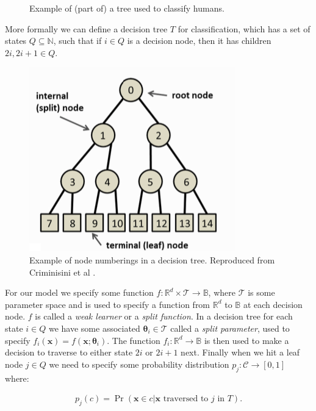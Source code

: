 \documentclass[12pt,twoside,notitlepage]{report}
\newcommand{\vc}[1]{\mathbf{#1}}
\newcommand{\cl}[1]{\mathcal{#1}}
\newcommand{\bb}[1]{\mathbb{#1}}
\begin{document}
\begin{figure}
                \caption{Example of (part of) a tree used to classify humans.}
                \label{fig:intuitive_tree}
            \end{figure}

            More formally we can define a decision tree $T$ for classification, which has a set of states $Q \subseteq 
            \bb{N}$, such that if $i \in Q$ is a decision node, then it has children $2i, 2i+1 \in Q$. 

            \begin{figure}
                \centering
                \includegraphics[scale=0.8]{tree_node_labels}
                \caption[Example of node numberings in a decision tree.]{Example of node numberings in a decision tree. Reproduced from Criminisini et al \cite{criminisi2012decision}.}
            \end{figure}

            For our model we specify some function $f:\bb{R}^d \times \cl{T} \rightarrow \bb{B}$, where $\cl{T}$ is some 
            parameter space and is used to specify a function from $\bb{R}^d$ to $\bb{B}$ at each decision node.  
            $f$ is called a \textit{weak learner} or a \textit{split function}. In a decision tree for each state $i \in Q$ we have 
            some associated $\vc{\theta}_i \in \cl{T}$ called a \textit{split parameter}, used to specify 
            $f_i(\vc{x}) = f(\vc{x}; \vc{\theta}_i)$. The function $f_i : \bb{R}^d \rightarrow \bb{B}$ is then used to 
            make a decision to traverse to either state $2i$ or $2i+1$ next. Finally when we hit a leaf node $j \in Q$ we need 
            to specify some probability distribution $p_j:\cl{C} \rightarrow [0,1]$ where:

            \begin{align}
                p_j(c) = \Pr(\vc{x} \in c | \vc{x} \text{ traversed to } j \text{ in } T).
            \end{align}
\end{document}
